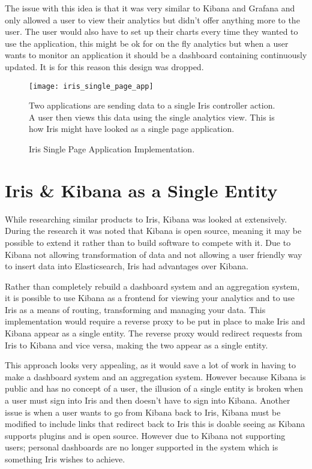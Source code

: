 \documentclass[12pt,a4paper,titlepage]{report}
\begin{document}
\begin{appendices}
The issue with this idea is that it was very similar to Kibana and Grafana and only allowed a user to view their analytics but didn't offer anything more to the user. The user would also have to set up their charts every time they wanted to use the application, this might be ok for on the fly analytics but when a user wants to monitor an application it should be a dashboard containing continuously updated. It is for this reason this design was dropped. 

\begin{figure}[H]
\begin{tcolorbox}
\centerline{\texttt{[image: iris\_single\_page\_app]}}

Two applications are sending data to a single Iris controller action. A user then views this data using the single analytics view. This is how Iris might have looked as a single page application.
\end{tcolorbox}
\caption{Iris Single Page Application Implementation.}
\end{figure}

\section{Iris \& Kibana as a Single Entity}

While researching similar products to Iris, Kibana was looked at extensively. During the research it was noted that Kibana is open source, meaning it may be possible to extend it rather than to build software to compete with it. Due to Kibana not allowing transformation of data and not allowing a user friendly way to insert data into Elasticsearch, Iris had advantages over Kibana. 

Rather than completely rebuild a dashboard system and an aggregation system, it is possible to use Kibana as a frontend for viewing your analytics and to use Iris as a means of routing, transforming and managing your data. This implementation would require a reverse proxy to be put in place to make Iris and Kibana appear as a single entity. The reverse proxy would redirect requests from Iris to Kibana and vice versa, making the two appear as a single entity.

This approach looks very appealing, as it would save a lot of work in having to make a dashboard system and an aggregation system. However because Kibana is public and has no concept of a user, the illusion of a single entity is broken when a user must sign into Iris and then doesn't have to sign into Kibana. Another issue is when a user wants to go from Kibana back to Iris, Kibana must be modified to include links that redirect back to Iris this is doable seeing as Kibana supports plugins and is open source. However due to Kibana not supporting users; personal dashboards are no longer supported in the system which is something Iris wishes to achieve.


\end{appendices}
\end{document}
